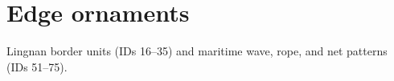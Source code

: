 \chapter{Edge ornaments}

Lingnan border units (IDs 16--35) and maritime wave, rope, and net patterns (IDs 51--75).


